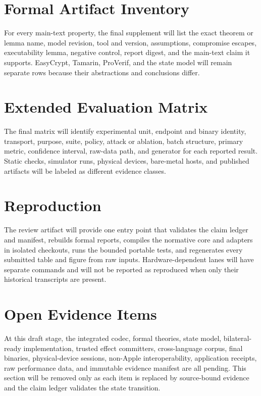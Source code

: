 \documentclass[journal]{IEEEtran}
\begin{document}
\section{Formal Artifact Inventory}
For every main-text property, the final supplement will list the exact theorem or
lemma name, model revision, tool and version, assumptions, compromise escapes,
executability lemma, negative control, report digest, and the main-text claim it
supports. EasyCrypt, Tamarin, ProVerif, and the state model will remain separate
rows because their abstractions and conclusions differ.

\section{Extended Evaluation Matrix}
The final matrix will identify experimental unit, endpoint and binary identity,
transport, purpose, suite, policy, attack or ablation, batch structure, primary
metric, confidence interval, raw-data path, and generator for each reported
result. Static checks, simulator runs, physical devices, bare-metal hosts, and
published artifacts will be labeled as different evidence classes.

\section{Reproduction}
The review artifact will provide one entry point that validates the
claim ledger and manifest, rebuilds formal reports, compiles the normative core
and adapters in isolated checkouts, runs the bounded portable tests, and
regenerates every submitted table and figure from raw inputs. Hardware-dependent
lanes will have separate commands and will not be reported as reproduced when
only their historical transcripts are present.

\section{Open Evidence Items}
At this draft stage, the integrated codec, formal theories, state model,
bilateral-ready implementation, trusted effect committers, cross-language
corpus, final binaries, physical-device sessions, non-Apple interoperability,
application receipts, raw performance data, and immutable
evidence manifest are all pending. This section will be removed only as each item
is replaced by source-bound evidence and the claim ledger validates the state
transition.
\end{document}
